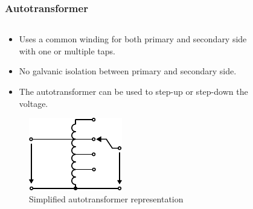 \begin{frame}
	\frametitle{Autotransformer}
	\begin{columns}
		\begin{column}{0.575\textwidth}
            \begin{itemize}
                \item Uses a common winding for both primary and secondary side with one or multiple taps.
                \item No galvanic isolation between primary and secondary side.
                \item The autotransformer can be used to step-up or step-down the voltage.
            \end{itemize}
			\begin{figure}
                \centering
                \includegraphics[height=0.3\textheight]{fig/lec04/Autotransformer_symbol.pdf}
                \caption{Simplified autotransformer representation}
            \end{figure}
		\end{column}
        \hfill
		\begin{column}{0.425\textwidth}
            \vspace{-0.2cm}
			\onslide<2->\begin{figure}
				\centering

\end{figure}
\end{column}
\end{columns}
\end{frame}
